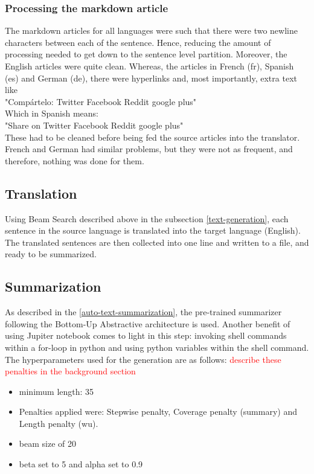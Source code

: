 \documentclass[12pt,a4paper,twoside,openright]{report}
\newcommand{\red}[1]{\textcolor{red}{#1}}
\newcommand{\changedFont}[1]{{\fontfamily{qcr}\selectfont #1}}
\begin{document}
\subsubsection{Processing the markdown article}
The markdown articles for all languages were such that there were two newline characters between each of the sentence. Hence, reducing the amount of processing needed to get down to the sentence level partition. Moreover, the English articles were quite clean. Whereas, the articles in French (fr), Spanish (es) and German (de), there were hyperlinks and, most importantly, extra text like \\
\changedFont{"Compártelo: Twitter Facebook Reddit google plus"}\\
Which in Spanish means: \\
\changedFont{"Share on Twitter Facebook Reddit google plus"}\\
These had to be cleaned before being fed the source articles into the translator. French and German had similar problems, but they were not as frequent, and therefore, nothing was done for them. 

\subsection{Translation}
\label{translation}
Using Beam Search described above in the subsection \ref{text-generation}, each sentence in the source language is translated into the target language (English). The translated sentences are then collected into one line and written to a file, and ready to be summarized. 

\subsection{Summarization}
\label{summarization}
As described in the \ref{auto-text-summarization}, the pre-trained summarizer following the Bottom-Up Abstractive architecture is used. Another benefit of using Jupiter notebook comes to light in this step: invoking shell commands within a for-loop in python and using python variables within the shell command. The hyperparameters used for the generation are as follows: 
\red{describe these penalties in the background section}
\begin{itemize}
    \item minimum length: 35
    \item Penalties applied were: Stepwise penalty, Coverage penalty (summary) and Length penalty (wu). 
    \item beam size of 20
    \item beta set to 5 and alpha set to 0.9
\end{itemize}
\end{document}
